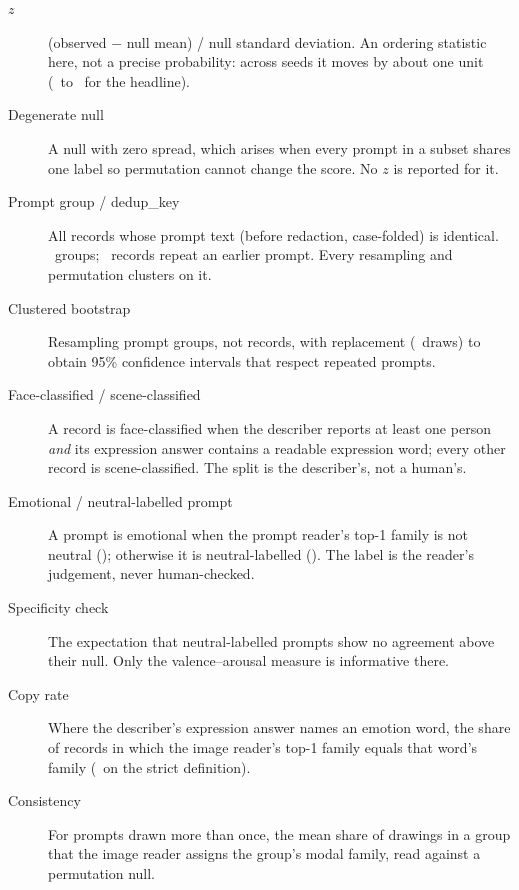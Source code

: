 \begin{description}
\item[$z$] (observed $-$ null mean) / null standard deviation. An ordering statistic here, not a precise probability: across seeds it moves by about one unit (\ZSeedMin\ to \ZSeedMax\ for the headline).
\item[Degenerate null] A null with zero spread, which arises when every prompt in a subset shares one label so permutation cannot change the score. No $z$ is reported for it.
\item[Prompt group / dedup\_key] All records whose prompt text (before redaction, case-folded) is identical. \nDistinct\ groups; \nRepeats\ records repeat an earlier prompt. Every resampling and permutation clusters on it.
\item[Clustered bootstrap] Resampling prompt groups, not records, with replacement (\DiffDraws\ draws) to obtain 95\% confidence intervals that respect repeated prompts.
\item[Face-classified / scene-classified] A record is face-classified when the describer reports at least one person \emph{and} its expression answer contains a readable expression word; every other record is scene-classified. The split is the describer's, not a human's.
\item[Emotional / neutral-labelled prompt] A prompt is emotional when the prompt reader's top-1 family is not neutral (\nEmotional); otherwise it is neutral-labelled (\nNonEmotional). The label is the reader's judgement, never human-checked.
\item[Specificity check] The expectation that neutral-labelled prompts show no agreement above their null. Only the valence--arousal measure is informative there.
\item[Copy rate] Where the describer's expression answer names an emotion word, the share of records in which the image reader's top-1 family equals that word's family (\DescCopyStrict\ on the strict definition).
\item[Consistency] For prompts drawn more than once, the mean share of drawings in a group that the image reader assigns the group's modal family, read against a permutation null.
\end{description}
